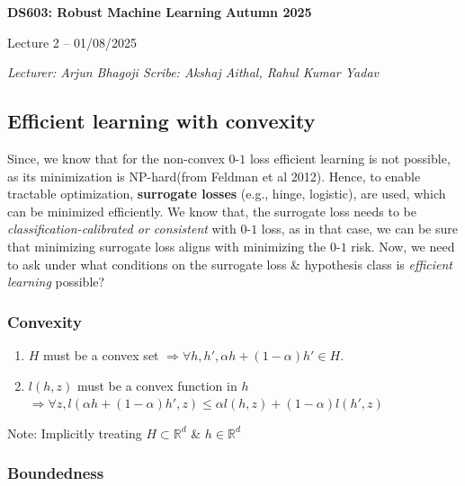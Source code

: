 \documentclass[11pt]{article}
\theoremstyle{plain}
\begin{document}
\thispagestyle{plain}

\begin{tcolorbox}[colback=white, colframe=black, boxrule=1pt, sharp corners]
\textbf{DS603: Robust Machine Learning} \hfill \textbf{Autumn 2025}
\begin{center}
\vspace{2mm}
Lecture 2 -- 01/08/2025
\end{center}
\vspace{2mm}
\noindent\textit{Lecturer: Arjun Bhagoji \hfill Scribe: Akshaj Aithal, Rahul Kumar Yadav}
\end{tcolorbox}

\subsection{Efficient learning with convexity}

Since, we know that for the non-convex $0$-$1$ loss efficient learning is not possible, as its minimization is NP-hard(from Feldman et al 2012). Hence,
to enable tractable optimization, \textbf{surrogate losses} (e.g., hinge, logistic), are used, which can be minimized efficiently.
We know that, the surrogate loss needs to be \emph{classification-calibrated or consistent} with $0$-$1$ loss, as in that case, we can be sure that minimizing surrogate loss aligns with minimizing the $0$-$1$ risk.
Now, we need to ask under what conditions on the surrogate loss \& hypothesis class is
\textit{efficient learning} possible?


\subsubsection{Convexity}\label{sec:Convexity}
\begin{enumerate}
  \item $H$ must be a convex set $\Rightarrow \forall h, h',\alpha h + (1-\alpha)h' \in H$. 
  \item $l(h,z)$ must be a convex function in $h$ $\Rightarrow \forall z, l(\alpha h+(1-\alpha)h',z) \leq \alpha l(h,z) + (1-\alpha)l(h',z)$
\end{enumerate}

\small{Note: Implicitly treating $H\subset\mathbb{R}^d$ \& $h\in \mathbb{R}^d$}

\subsubsection{Boundedness}\label{sec:Boundedness}
\end{document}
